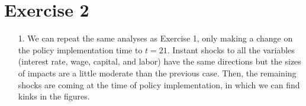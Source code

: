 \documentclass[11pt]{article} %
\begin{document}
\section*{Exercise 2}
\begin{itemize}
	\item[1.] We can repeat the same analyses as Exercise 1, only making a change on the policy implementation time to $t=21$. Instant shocks to all the variables (interest rate, wage, capital, and labor) have the same directions but the sizes of impacts are a little moderate than the previous case. Then, the remaining shocks are coming at the time of policy implementation, in which we can find kinks in the figures.
	
	
		\begin{figure}[h]
			\centering
		\end{figure}

		\begin{figure}[h]
			\centering
		\end{figure}
	

\end{itemize}
\end{document}
